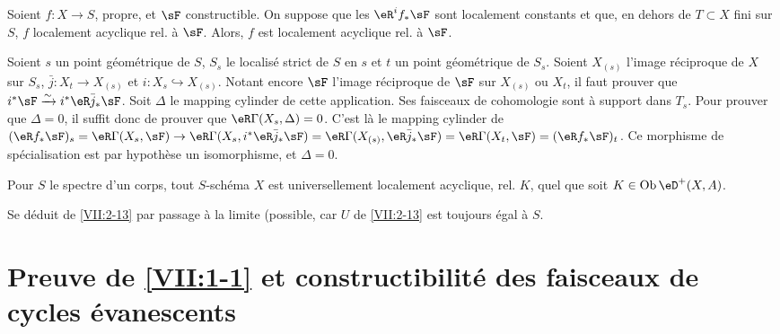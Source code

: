 \begin{lemma_}\label{VII:2-15}
Soient $f:X\to S$, propre, et $\sF$ constructible. On suppose que les 
$\eR^i f_\ast \sF$ sont localement constants et que, en dehors de $T\subset X$ 
fini sur $S$, $f$ localement acyclique rel. à $\sF$. Alors, $f$ est 
localement acyclique rel. à $\sF$. 
\end{lemma_}

Soient $s$ un point géométrique de $S$, $S_s$ le localisé strict de $S$ 
en $s$ et $t$ un point géométrique de $S_s$. Soient $X_{(s)}$ l'image 
réciproque de $X$ sur $S_s$, $\bar j:X_t \to X_{(s)}$ et 
$i:X_s \hookrightarrow X_{(s)}$. Notant encore $\sF$ l'image réciproque de 
$\sF$ sur $X_{(s)}$ ou $X_t$, il faut prouver que 
$i^\ast \sF \iso i^\ast \eR \bar j_\ast \sF$. Soit $\Delta$ le mapping cylinder 
de cette application. Ses faisceaux de cohomologie sont à support dans $T_s$. 
Pour prouver que $\Delta=0$, il suffit donc de prouver que 
$\eR\Gamma(X_s,\Delta)=0$. C'est là le mapping cylinder de 
$(\eR f_\ast \sF)_s = \eR\Gamma(X_s,\sF) \to \eR\Gamma(X_s,i^\ast \eR\bar j_\ast \sF) = \eR\Gamma(X_{(s)},\eR\bar j_\ast \sF) = \eR\Gamma(X_t,\sF) = (\eR f_\ast \sF)_t$. 
Ce morphisme de spécialisation est par hypothèse un isomorphisme, et 
$\Delta=0$. 





\begin{corollary_}\label{VII:2-16}
Pour $S$ le spectre d'un corps, tout $S$-schéma $X$ est universellement 
localement acyclique, rel. $K$, quel que soit $K\in\ob\eD^+(X,A)$. 
\end{corollary_}

Se déduit de \ref{VII:2-13} par passage à la limite (possible, car $U$ de 
\ref{VII:2-13} est toujours égal à $S$. 










\section{Preuve de \texorpdfstring{\ref{VII:1-1}}{1.1} et constructibilité des faisceaux de cycles évanescents}\label{VII:3}





\subsection{}\label{VII:3-1}

